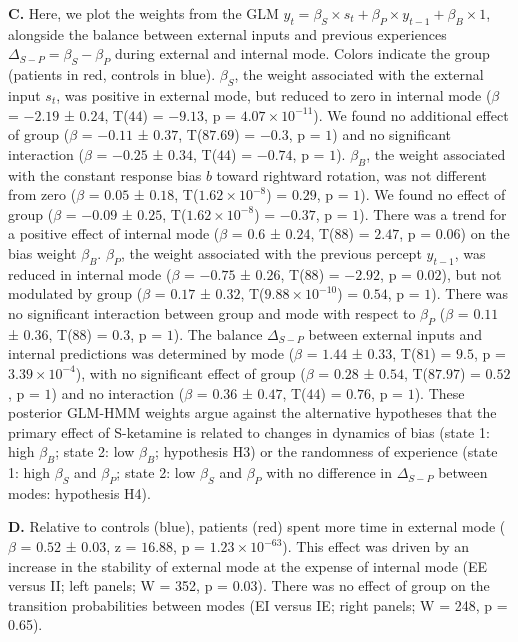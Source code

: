 \documentclass[
]{article}
\begin{document}
\textbf{C.} Here, we plot the weights from the GLM
\(y_t = \beta_S \times s_t + \beta_P \times y_{t-1} + \beta_B \times 1\),
alongside the balance between external inputs and previous experiences
\(\Delta_{S-P} = \beta_S - \beta_P\) during external and internal mode.
Colors indicate the group (patients in red, controls in blue).
\(\beta_S\), the weight associated with the external input \(s_t\), was
positive in external mode, but reduced to zero in internal mode
(\(\beta\) = \(-2.19\) ± \(0.24\), T(\(44\)) = \(-9.13\), p =
\(\ensuremath{4.07\times 10^{-11}}\)). We found no additional effect of
group (\(\beta\) = \(-0.11\) ± \(0.37\), T(\(87.69\)) = \(-0.3\), p =
\(1\)) and no significant interaction (\(\beta\) = \(-0.25\) ± \(0.34\),
T(\(44\)) = \(-0.74\), p = \(1\)). \(\beta_B\), the weight associated
with the constant response bias \(b\) toward rightward rotation, was not
different from zero (\(\beta\) = \(0.05\) ± \(0.18\),
T(\(\ensuremath{1.62\times 10^{-8}}\)) = \(0.29\), p = \(1\)). We found
no effect of group (\(\beta\) = \(-0.09\) ± \(0.25\),
T(\(\ensuremath{1.62\times 10^{-8}}\)) = \(-0.37\), p = \(1\)). There
was a trend for a positive effect of internal mode (\(\beta\) = \(0.6\)
± \(0.24\), T(\(88\)) = \(2.47\), p = \(0.06\)) on the bias weight
\(\beta_B\). \(\beta_P\), the weight associated with the previous
percept \(y_{t-1}\), was reduced in internal mode (\(\beta\) = \(-0.75\)
± \(0.26\), T(\(88\)) = \(-2.92\), p = \(0.02\)), but not modulated by
group (\(\beta\) = \(0.17\) ± \(0.32\),
T(\(\ensuremath{9.88\times 10^{-10}}\)) = \(0.54\), p = \(1\)). There
was no significant interaction between group and mode with respect to
\(\beta_P\) (\(\beta\) = \(0.11\) ± \(0.36\), T(\(88\)) = \(0.3\), p =
\(1\)). The balance \(\Delta_{S-P}\) between external inputs and
internal predictions was determined by mode (\(\beta\) = \(1.44\) ±
\(0.33\), T(\(81\)) = \(9.5\), p = \(\ensuremath{3.39\times 10^{-4}}\)),
with no significant effect of group (\(\beta\) = \(0.28\) ± \(0.54\),
T(\(87.97\)) = \(0.52\), p = \(1\)) and no interaction (\(\beta\) =
\(0.36\) ± \(0.47\), T(\(44\)) = \(0.76\), p = \(1\)). These posterior
GLM-HMM weights argue against the alternative hypotheses that the
primary effect of S-ketamine is related to changes in dynamics of bias
(state 1: high \(\beta_B\); state 2: low \(\beta_B\); hypothesis H3) or
the randomness of experience (state 1: high \(\beta_S\) and \(\beta_P\);
state 2: low \(\beta_S\) and \(\beta_P\) with no difference in
\(\Delta_{S-P}\) between modes: hypothesis H4).

\textbf{D.} Relative to controls (blue), patients (red) spent more time
in external mode (\(\beta\) = \(0.52\) ± \(0.03\), z = \(16.88\), p =
\(\ensuremath{1.23\times 10^{-63}}\)). This effect was driven by an
increase in the stability of external mode at the expense of internal
mode (EE versus II; left panels; W = 352, p = 0.03). There was no effect
of group on the transition probabilities between modes (EI versus IE;
right panels; W = 248, p = 0.65).
\end{document}
